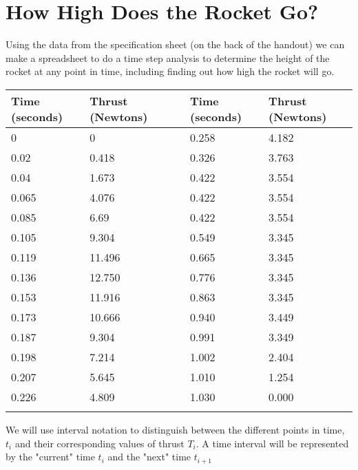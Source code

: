 \documentclass [12pt, letterpaper, titlepage] {article}
\begin{document}
\section*{How High Does the Rocket Go?}
Using the data from the specification sheet (on the back of the handout) we can make a spreadsheet to do a time step analysis to determine the height of the rocket at any point in time, including finding out how high the rocket will go.
\begin{center}
\begin{tabular}{l l c l l}
\toprule
Time (seconds)	 & Thrust (Newtons)&  &  Time (seconds)	& Thrust (Newtons)\\
\toprule
0			& 0 			&	& 0.258			& 4.182 \\ \hline
0.02			& 0.418 		&	& 0.326			& 3.763 \\ \hline
0.04			& 1.673 		&	& 0.422			& 3.554 \\ \hline
0.065		& 4.076 		&	& 0.422			& 3.554 \\ \hline
0.085		& 6.69 		&	& 0.422			& 3.554 \\ \hline
0.105		& 9.304 		&	& 0.549			& 3.345 \\ \hline
0.119		& 11.496 		&	& 0.665			& 3.345 \\ \hline
0.136		& 12.750		&	& 0.776			& 3.345 \\ \hline
0.153		& 11.916 		&	& 0.863			& 3.345 \\ \hline
0.173		& 10.666 		&	& 0.940			& 3.449 \\ \hline
0.187		& 9.304 		&	& 0.991			& 3.349 \\ \hline
0.198		& 7.214		&	& 1.002			& 2.404 \\ \hline
0.207		& 5.645		&	& 1.010			& 1.254 \\ \hline
0.226		& 4.809		&	& 1.030			& 0.000 \\
\bottomrule \\			
\end{tabular}
\end{center}
We will use interval notation to distinguish between the different points in time, $t_i$ and their corresponding values of thrust $T_i$. A time interval will be represented by the "current" time $t_i$ and the "next" time $t_{i+1}$
\end{document}
